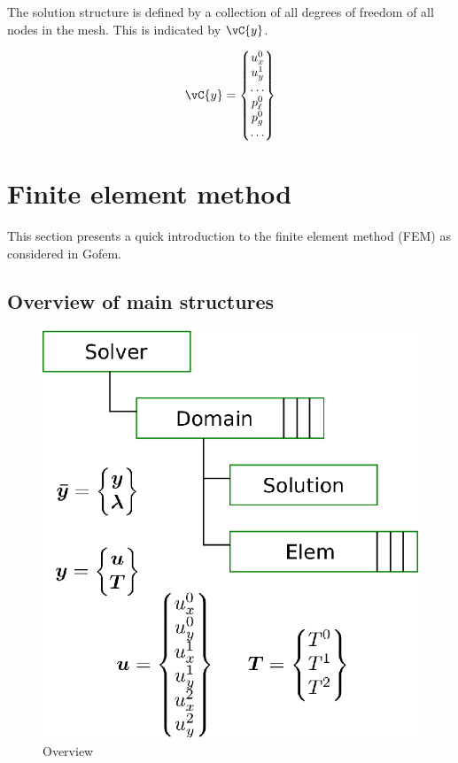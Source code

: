 \documentclass[twoside,journal]{IEEEtran}
\begin{document}
The solution structure is defined by a collection of all degrees of freedom of all nodes in the
mesh. This is indicated by $\vC{y}$.

\begin{equation}
    \vC{y} = \begin{Bmatrix}
        u_x^0 \\ u_y^1 \\ \ldots \\ p_\ell^0 \\ p_g^0 \\ \ldots
    \end{Bmatrix}
\end{equation}


\section{Finite element method}

This section presents a quick introduction to the finite element method (FEM) as considered in
Gofem.

\subsection{Overview of main structures}


\begin{figure} \centering
\includegraphics[scale=0.7]{./figs/overview.eps}
\caption{Overview}
\label{fig:overview}
\end{figure}
\end{document}
